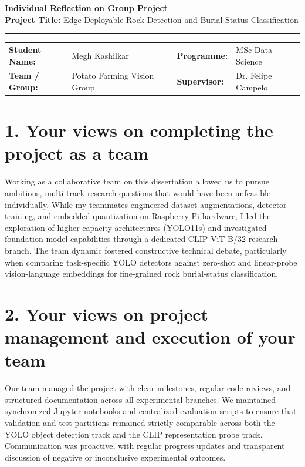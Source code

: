 \documentclass[11pt, a4paper]{article}
\begin{document}
\begin{center}
    {\Large \bfseries Individual Reflection on Group Project} \\[0.3em]
    {\small \textbf{Project Title:} Edge-Deployable Rock Detection and Burial Status Classification} \\[0.2em]
    \rule{\textwidth}{1pt}
\end{center}

\vspace{-0.5em}
\noindent
\begin{tabular}{@{}ll p{2cm} ll@{}}
    \textbf{Student Name:} & Megh Kashilkar & & \textbf{Programme:} & MSc Data Science \\
    \textbf{Team / Group:} & Potato Farming Vision Group & & \textbf{Supervisor:} & Dr. Felipe Campelo \\
\end{tabular}

\vspace{0.2em}

\section*{1. Your views on completing the project as a team}
Working as a collaborative team on this dissertation allowed us to pursue ambitious, multi-track research questions that would have been unfeasible individually. While my teammates engineered dataset augmentations, detector training, and embedded quantization on Raspberry Pi hardware, I led the exploration of higher-capacity architectures (YOLO11s) and investigated foundation model capabilities through a dedicated CLIP ViT-B/32 research branch. The team dynamic fostered constructive technical debate, particularly when comparing task-specific YOLO detectors against zero-shot and linear-probe vision-language embeddings for fine-grained rock burial-status classification.

\section*{2. Your views on project management and execution of your team}
Our team managed the project with clear milestones, regular code reviews, and structured documentation across all experimental branches. We maintained synchronized Jupyter notebooks and centralized evaluation scripts to ensure that validation and test partitions remained strictly comparable across both the YOLO object detection track and the CLIP representation probe track. Communication was proactive, with regular progress updates and transparent discussion of negative or inconclusive experimental outcomes.
\end{document}
